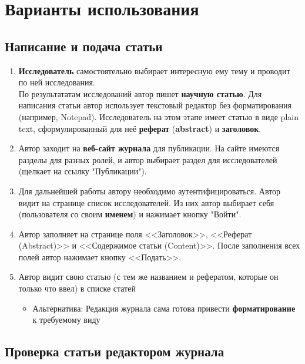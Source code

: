 \section{Варианты использования}

\subsection{Написание и подача статьи}

\begin{enumerate}
\item
  \textbf{Исследователь} самостоятельно выбирает интересную ему тему и проводит по ней исследования. \\
  По результататам исследований автор пишет
  \textbf{научную статью}. Для написания статьи автор использует текстовый редактор без форматирования (например, Notepad). Исследователь на этом этапе имеет статью в виде plain text, сформулированный для неё \textbf{реферат} (\textbf{abstract}) и \textbf{заголовок}.
\item
  Автор заходит на \textbf{веб-сайт журнала} для публикации. На сайте имеются разделы для разных ролей, и автор выбирает раздел для исследователей (щелкает на ссылку "Публикации").
\item Для дальнейшей работы автору необходимо аутентифицироваться. Автор видит на странице список исследователей. Из них автор выбирает себя (пользователя со своим \textbf{именем}) и нажимает кнопку "Войти".
\item
  Автор заполняет на странице поля <<Заголовок>>, <<Реферат (Abstract)>> и <<Содержимое статьи (Content)>>. После заполнения всех полей автор нажимает кнопку <<Подать>>.
\item
  Автор видит свою статью (с тем же названием и рефератом, которые он только что ввел) в списке статей
  
  \begin{itemize}
  \item
    Альтернатива: Редакция журнала сама готова привести
    \textbf{форматирование} к требуемому виду
  \end{itemize}
\end{enumerate}

\subsection{Проверка статьи редактором журнала}

